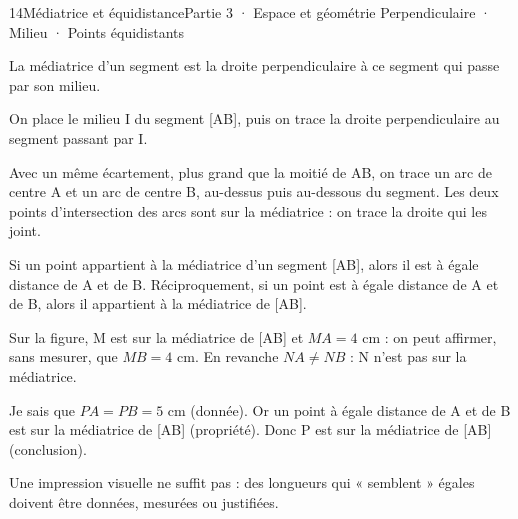 \begin{ouverture}[geometrie]{14}{Médiatrice et équidistance}{Partie 3 · Espace et géométrie}
{Perpendiculaire · Milieu · Points équidistants}
\end{ouverture}
\pagestyle{otMain}\essentiel\fontsize{11}{15}\selectfont
{}\label{cours-14-1}
\begin{definition}La médiatrice d’un segment est la droite perpendiculaire à ce segment qui passe par son milieu.\end{definition}
\label{fig-cours-14-1-cours-mediatrice}

\begin{savoirfaire}On place le milieu I du segment [AB], puis on trace la droite perpendiculaire au segment passant par I.\end{savoirfaire}
\begin{savoirfaire}[Au compas]Avec un même écartement, plus grand que la moitié de AB, on trace un arc de centre A et un arc de centre B, au-dessus puis au-dessous du segment. Les deux points d’intersection des arcs sont sur la médiatrice : on trace la droite qui les joint.\end{savoirfaire}
\clearpage
{}\label{cours-14-2}
\begin{propriete}Si un point appartient à la médiatrice d’un segment [AB], alors il est à égale distance de A et de B. Réciproquement, si un point est à égale distance de A et de B, alors il appartient à la médiatrice de [AB].\end{propriete}
\label{fig-cours-14-2-cours-equidistance}

\begin{exemple}Sur la figure, M est sur la médiatrice de [AB] et $MA=4$ cm : on peut affirmer, sans mesurer, que $MB=4$ cm. En revanche $NA\ne NB$ : N n’est pas sur la médiatrice.\end{exemple}
\begin{savoirfaire}Je sais que $PA=PB=5$ cm (donnée). Or un point à égale distance de A et de B est sur la médiatrice de [AB] (propriété). Donc P est sur la médiatrice de [AB] (conclusion).\end{savoirfaire}
\begin{attention}Une impression visuelle ne suffit pas : des longueurs qui « semblent » égales doivent être données, mesurées ou justifiées.\end{attention}

